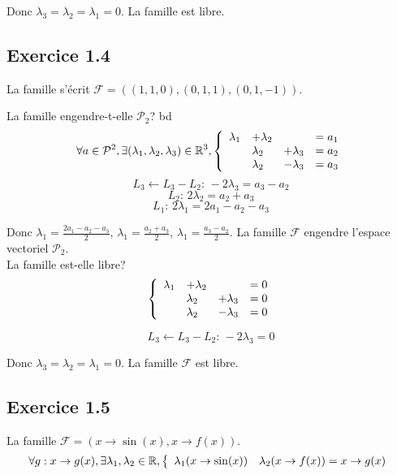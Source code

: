 \documentclass[]{book}
\theoremstyle{definition}
\newcommand{\bb}[1]{\mathbb{#1}}
\newcommand{\R}{\bb{R}}
\begin{document}
Donc $\lambda_3 = \lambda_2 = \lambda_1 = 0$. La famille est libre.

\subsection*{Exercice 1.4}
La famille s'\'ecrit $\mathcal{F} = ((1,1,0),(0,1,1),(0,1,-1))$.

La famille engendre-t-elle $\mathcal{P}_2$?
bd
$$ \forall a \in \mathcal{P}^2, \exists (\lambda_1,\lambda_2,\lambda_3) \in \R^3,
\left\{ 
\begin{array}{l l l l}
  \lambda_1 & +\lambda_2 &               & = a_1 \\
            & \lambda_2  & +\lambda_3   & = a_2 \\
            & \lambda_2  & -\lambda_3   & = a_3 \\
\end{array}
\right. 
$$
$$L_3 \leftarrow L_3-L_2:\, -2\lambda_3 = a_3-a_2$$
$$L_2:\, 2\lambda_2 = a_2+a_3$$
$$L_1:\, 2\lambda_1 = 2a_1-a_2-a_3$$

Donc $\lambda_1 = \frac{2a_1-a_2-a_3}{2}$, $\lambda_1 = \frac{a_2+a_3}{2}$, $\lambda_1 = \frac{a_3-a_2}{2}$. La famille $\mathcal{F}$ engendre l'espace vectoriel $\mathcal{P}_2$.\\

\medskip
La famille est-elle libre?
$$
\left\{ 
\begin{array}{l l l l}
  \lambda_1 & +\lambda_2 &               & = 0 \\
            & \lambda_2  & +\lambda_3   & = 0 \\
            & \lambda_2  & -\lambda_3   & = 0 \\
\end{array}
\right. 
$$

$$L_3 \leftarrow L_3-L_2:\, -2\lambda_3 = 0$$

Donc $\lambda_3 = \lambda_2 = \lambda_1 = 0$. La famille $\mathcal{F}$ est libre.

\subsection*{Exercice 1.5}
La famille $\mathcal{F} = (x \to \sin(x),x \to f(x))$.
$$
\forall g: x \to g(x), \exists \lambda_1, \lambda_2 \in \R,
\left\{ 
\begin{array}{l l}
  \lambda_1(x \to \sin(x)) & \lambda_2(x \to f(x)) = x \to g(x) \\
\end{array}
\right. 
$$
\end{document}
